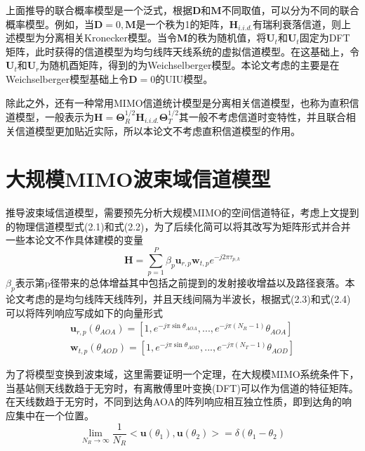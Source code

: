 \documentclass[bachelor,nocolorlinks, printoneside]{seuthesis} %
\begin{document}
\begin{Main}
上面推导的联合概率模型是一个泛式，根据$ \mathbf{D}$和$\mathbf{M}$不同取值，可以分为不同的联合概率模型。例如，当$\mathbf{D}=0,\mathbf{M}$是一个秩为1的矩阵，$\mathbf{H}_{i.i.d.}$有瑞利衰落信道，则上述模型为分离相关Kronecker模型。当令$\mathbf{M}$的秩为随机值，将$\mathbf{U}_t$和$\mathbf{U}_t$固定为DFT矩阵，此时获得的信道模型为均匀线阵天线系统的虚拟信道模型。在这基础上，令$\mathbf{U}_t$和$\mathbf{U}_r$为随机酉矩阵，得到的为Weichselberger模型。本论文考虑的主要是在Weichselberger模型基础上令$ \mathbf{D} = 0 $的UIU模型。

除此之外，还有一种常用MIMO信道统计模型是分离相关信道模型，也称为直积信道模型，一般表示为$ \mathbf{H} = \bm{\Theta}_R^{1/2} \mathbf{H}_{i.i.d.} \bm{\Theta}_T^{1/2}$其一般不考虑信道时变特性，并且联合相关信道模型更加贴近实际，所以本论文不考虑直积信道模型的作用。

\section{大规模MIMO波束域信道模型}
推导波束域信道模型，需要预先分析大规模MIMO的空间信道特征\cite{SunchenBD}\cite{Youli2}，考虑上文提到的物理信道模型式(2.1)和式(2.2)，为了后续化简可以将其改写为矩阵形式并合并一些本论文不作具体建模的变量
\begin{equation}\label{key}
\mathbf{H} = \sum_{p=1}^{P}\beta_p \mathbf{u}_{r,p}\mathbf{w}_{t,p}e^{-j2\pi \tau_{p,k}}
\end{equation}
$\beta_p$表示第p径带来的总体增益其中包括之前提到的发射接收增益以及路径衰落。本论文考虑的是均匀线阵天线阵列，并且天线间隔为半波长，根据式(2.3)和式(2.4)可以将阵列响应写成如下的向量形式
\begin{eqnarray}\label{key}
\mathbf{u}_{r,p}(\theta_{AOA}) = [1,e^{-j\pi \sin \theta_{AOA}},...,e^{-j\pi (N_R-1)}\theta_{AOA}] \\
\mathbf{w}_{t,p}(\theta_{AOD}) = [1,e^{-j\pi \sin \theta_{AOD}},...,e^{-j\pi (N_T-1)}\theta_{AOD}]
\end{eqnarray}

为了将模型变换到波束域，这里需要证明一个定理，在大规模MIMO系统条件下，当基站侧天线数趋于无穷时，有离散傅里叶变换(DFT)可以作为信道的特征矩阵。在天线数趋于无穷时，不同到达角AOA的阵列响应相互独立性质，即到达角的响应集中在一个位置。
\begin{equation}\label{key}
\lim_{N_R \rightarrow \infty}\frac{1}{N_R}<\mathbf{u}(\theta_1),\mathbf{u}(\theta_2)> = \delta(\theta_1 -\theta_2)
\end{equation}


\end{Main}
\end{document}
